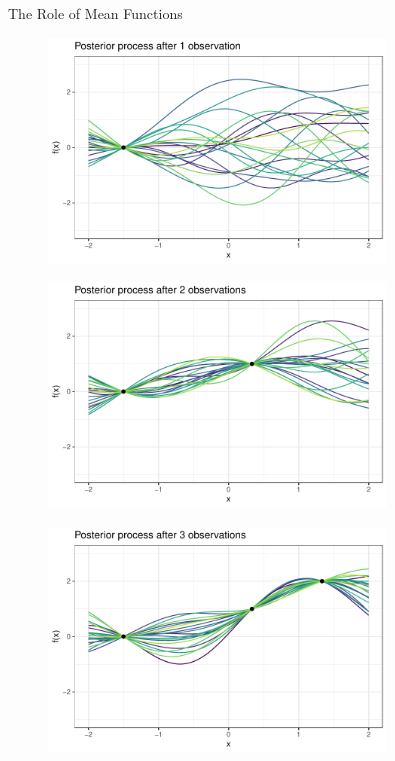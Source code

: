\begin{vbframe}{The Role of Mean Functions}
\begin{itemize}
\framebreak


\begin{figure}
\includegraphics[width=0.8\textwidth]{figure_man/gp-sample/gp-sample-2-1.pdf}
\end{figure}

\framebreak
 


\begin{figure}
\includegraphics[width=0.8\textwidth]{figure_man/gp-sample/gp-sample-2-2.pdf}
\end{figure}

 \framebreak
 
 
\begin{figure}
\includegraphics[width=0.8\textwidth]{figure_man/gp-sample/gp-sample-2-3.pdf}
\end{figure}


\end{itemize}
\end{vbframe}
